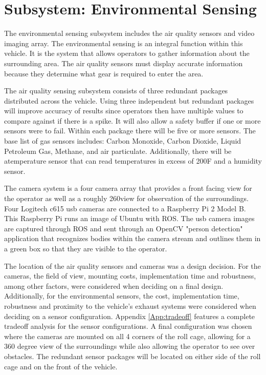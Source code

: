 \chapter{Subsystem: Environmental Sensing}

The environmental sensing subsystem includes the air quality sensors and video imaging array. The environmental sensing is an integral function within this vehicle. It is the system that allows operators to gather information about the surrounding area. The air quality sensors must display accurate information because they determine what gear is required to enter the area.

The air quality sensing subsystem consists of three redundant packages distributed across the vehicle. Using three independent but redundant packages will improve accuracy of results since operators then have multiple values to compare against if there is a spike. It will also allow a safety buffer if one or more sensors were to fail. Within each package there will be five or more sensors. The base list of gas sensors includes: Carbon Monoxide, Carbon Dioxide, Liquid Petroleum Gas, Methane, and air particulate. Additionally, there will be atemperature sensor that can read temperatures in excess of 200\degree F and a humidity sensor. 

The camera system is a four camera array that provides a front facing view for the operator as well as a roughly 260\degree  view for observation of the surroundings. Four Logitech c615 usb cameras are connected to a Raspberry Pi 2 Model B. This Raspberry Pi runs an image of Ubuntu with ROS. The usb camera images are captured through ROS and sent through an OpenCV "person detection" application that recognizes bodies within the camera stream and outlines them in a green box so that they are visible to the operator. 

The location of the air quality sensors and cameras was a design decision. For the cameras, the field of view, mounting costs, implementation time and robustness, among other factors, were considered when deciding on a final design. Additionally, for the environmental sensors, the cost, implementation time, robustness and proximity to the vehicle's exhaust systems were considered when deciding on a sensor configuration. Appendix \ref{App:tradeoff} features a complete tradeoff analysis for the sensor configurations. A final configuration was chosen where the cameras are mounted on all 4 corners of the roll cage, allowing for a 360 degree view of the surroundings while also allowing the operator to see over obstacles. The redundant sensor packages will be located on either side of the roll cage and on the front of the vehicle. 
